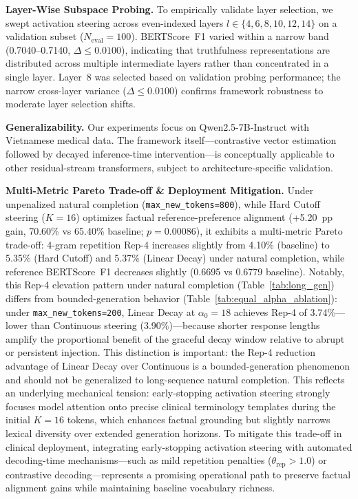 \textbf{Layer-Wise Subspace Probing.} To empirically validate layer selection, we swept activation steering across even-indexed layers $l \in \{4, 6, 8, 10, 12, 14\}$ on a validation subset ($N_{\text{eval}}=100$). BERTScore~F1 varied within a narrow band (0.7040--0.7140, $\Delta \le 0.0100$), indicating that truthfulness representations are distributed across multiple intermediate layers rather than concentrated in a single layer. Layer~8 was selected based on validation probing performance; the narrow cross-layer variance ($\Delta \le 0.0100$) confirms framework robustness to moderate layer selection shifts.

\textbf{Generalizability.} Our experiments focus on Qwen2.5-7B-Instruct \cite{ref4} with Vietnamese medical data. The framework itself---contrastive vector estimation followed by decayed inference-time intervention---is conceptually applicable to other residual-stream transformers, subject to architecture-specific validation.

\textbf{Multi-Metric Pareto Trade-off \& Deployment Mitigation.} Under unpenalized natural completion (\texttt{max\_new\_tokens=800}), while Hard Cutoff steering ($K=16$) optimizes factual reference-preference alignment (+5.20~pp gain, 70.60\% vs 65.40\% baseline; $p=0.00086$), it exhibits a multi-metric Pareto trade-off: 4-gram repetition Rep-4 increases slightly from 4.10\% (baseline) to 5.35\% (Hard Cutoff) and 5.37\% (Linear Decay) under natural completion, while reference BERTScore~F1 decreases slightly (0.6695 vs 0.6779 baseline). Notably, this Rep-4 elevation pattern under natural completion (Table~\ref{tab:long_gen}) differs from bounded-generation behavior (Table~\ref{tab:equal_alpha_ablation}): under \texttt{max\_new\_tokens=200}, Linear Decay at $\alpha_0=18$ achieves Rep-4 of 3.74\%---lower than Continuous steering (3.90\%)---because shorter response lengths amplify the proportional benefit of the graceful decay window relative to abrupt or persistent injection. This distinction is important: the Rep-4 reduction advantage of Linear Decay over Continuous is a bounded-generation phenomenon and should not be generalized to long-sequence natural completion. This reflects an underlying mechanical tension: early-stopping activation steering strongly focuses model attention onto precise clinical terminology templates during the initial $K=16$ tokens, which enhances factual grounding but slightly narrows lexical diversity over extended generation horizons. To mitigate this trade-off in clinical deployment, integrating early-stopping activation steering with automated decoding-time mechanisms---such as mild repetition penalties ($\theta_{\text{rep}} > 1.0$) or contrastive decoding---represents a promising operational path to preserve factual alignment gains while maintaining baseline vocabulary richness.

